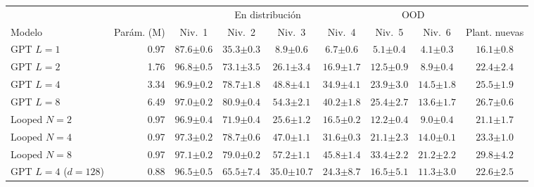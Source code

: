 \begin{tabular}{lrccccccc}
\toprule
 & & \multicolumn{4}{c}{En distribución} & \multicolumn{2}{c}{OOD} & \\
\cmidrule(lr){3-6}\cmidrule(lr){7-8}
Modelo & Parám. (M) & Niv.~1 & Niv.~2 & Niv.~3 & Niv.~4 & Niv.~5 & Niv.~6 & Plant. nuevas \\
\midrule
GPT $L{=}1$ & 0.97 & $87.6{\scriptstyle\pm0.6}$ & $35.3{\scriptstyle\pm0.3}$ & $8.9{\scriptstyle\pm0.6}$ & $6.7{\scriptstyle\pm0.6}$ & $5.1{\scriptstyle\pm0.4}$ & $4.1{\scriptstyle\pm0.3}$ & $16.1{\scriptstyle\pm0.8}$ \\
GPT $L{=}2$ & 1.76 & $96.8{\scriptstyle\pm0.5}$ & $73.1{\scriptstyle\pm3.5}$ & $26.1{\scriptstyle\pm3.4}$ & $16.9{\scriptstyle\pm1.7}$ & $12.5{\scriptstyle\pm0.9}$ & $8.9{\scriptstyle\pm0.4}$ & $22.4{\scriptstyle\pm2.4}$ \\
GPT $L{=}4$ & 3.34 & $96.9{\scriptstyle\pm0.2}$ & $78.7{\scriptstyle\pm1.8}$ & $48.8{\scriptstyle\pm4.1}$ & $34.9{\scriptstyle\pm4.1}$ & $23.9{\scriptstyle\pm3.0}$ & $14.5{\scriptstyle\pm1.8}$ & $25.5{\scriptstyle\pm1.9}$ \\
GPT $L{=}8$ & 6.49 & $97.0{\scriptstyle\pm0.2}$ & $\mathbf{80.9}{\scriptstyle\pm0.4}$ & $54.3{\scriptstyle\pm2.1}$ & $40.2{\scriptstyle\pm1.8}$ & $25.4{\scriptstyle\pm2.7}$ & $13.6{\scriptstyle\pm1.7}$ & $26.7{\scriptstyle\pm0.6}$ \\
\midrule
Looped $N{=}2$ & 0.97 & $96.9{\scriptstyle\pm0.4}$ & $71.9{\scriptstyle\pm0.4}$ & $25.6{\scriptstyle\pm1.2}$ & $16.5{\scriptstyle\pm0.2}$ & $12.2{\scriptstyle\pm0.4}$ & $9.0{\scriptstyle\pm0.4}$ & $21.1{\scriptstyle\pm1.7}$ \\
Looped $N{=}4$ & 0.97 & $\mathbf{97.3}{\scriptstyle\pm0.2}$ & $78.7{\scriptstyle\pm0.6}$ & $47.0{\scriptstyle\pm1.1}$ & $31.6{\scriptstyle\pm0.3}$ & $21.1{\scriptstyle\pm2.3}$ & $14.0{\scriptstyle\pm0.1}$ & $23.3{\scriptstyle\pm1.0}$ \\
Looped $N{=}8$ & 0.97 & $97.1{\scriptstyle\pm0.2}$ & $79.0{\scriptstyle\pm0.2}$ & $\mathbf{57.2}{\scriptstyle\pm1.1}$ & $\mathbf{45.8}{\scriptstyle\pm1.4}$ & $\mathbf{33.4}{\scriptstyle\pm2.2}$ & $\mathbf{21.2}{\scriptstyle\pm2.2}$ & $\mathbf{29.8}{\scriptstyle\pm4.2}$ \\
\midrule
GPT $L{=}4$ ($d{=}128$) & 0.88 & $96.5{\scriptstyle\pm0.5}$ & $65.5{\scriptstyle\pm7.4}$ & $35.0{\scriptstyle\pm10.7}$ & $24.3{\scriptstyle\pm8.7}$ & $16.5{\scriptstyle\pm5.1}$ & $11.3{\scriptstyle\pm3.0}$ & $22.6{\scriptstyle\pm2.5}$ \\
\bottomrule
\end{tabular}
